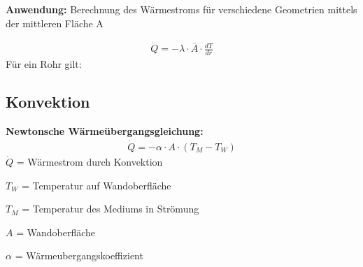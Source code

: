 \documentclass[a4paper,10pt,twoside]{article}
\begin{document}
\begin{minipage}[t]{.45\textwidth}
\begin{tcbraster}[raster columns=1, raster valign=top]
\end{tcbraster}
\end{minipage}
\hfill
\begin{minipage}[t]{.5\textwidth}
\pp
{\color{petunitext}\textbf{Anwendung:}}
Berechnung des Wärmestroms für verschiedene Geometrien mittels der mittleren Fläche A

\begin{align*}
\dot{Q} = - \lambda \cdot \overline{A} \cdot \frac{dT}{dr}
\end{align*}
Für ein Rohr gilt:
\vspace*{-8mm}
\subsection{Konvektion}
{\color{petunitext}\textbf{Newtonsche Wärmeübergangsgleichung:}}
\begin{align*}
\dot{Q} = - \alpha \cdot A \cdot (T_M - T_W)
\end{align*}
$\dot{Q}$ = Wärmestrom durch Konvektion \par 
$T_W$ = Temperatur auf Wandoberfläche \par 
$T_M$ = Temperatur des Mediums in Strömung \par 
$A$ = Wandoberfläche \par 
$\alpha$ = Wärmeubergangskoeffizient
\end{minipage}
\end{document}
